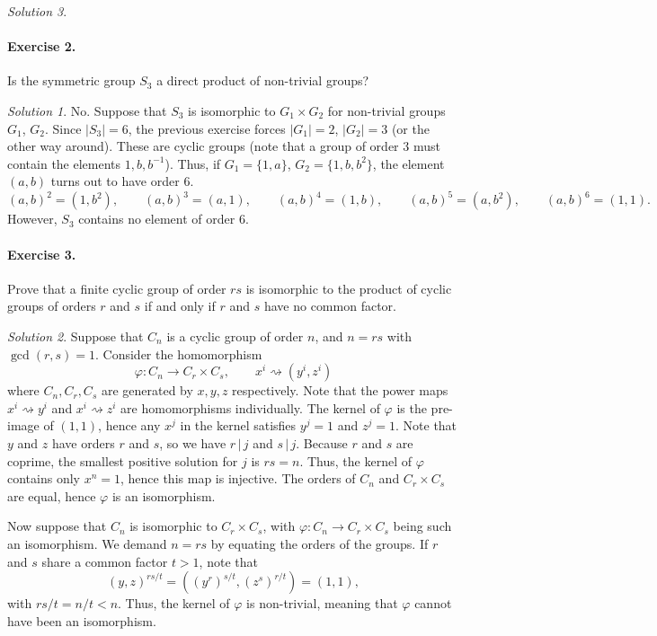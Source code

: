 \documentclass[11pt]{report}
\theoremstyle{remark}
\newtheorem*{solution}{Solution}
\begin{document}
\begin{solution}
    \paragraph{Exercise 2.} Is the symmetric group $S_3$ a direct product of
    non-trivial groups?
    \begin{solution}
        No. Suppose that $S_3$ is isomorphic to $G_1\times G_2$ for non-trivial
        groups $G_1$, $G_2$. Since $|S_3| = 6$, the previous exercise forces $|G_1|
        = 2$, $|G_2| = 3$ (or the other way around). These are cyclic groups (note
        that a group of order $3$ must contain the elements $1, b, b^{-1}$).
        Thus, if $G_1 = \{1, a\}$, $G_2 = \{1, b, b^2\}$, the element $(a, b)$ turns
        out to have order $6$. \[
            (a, b)^2 = (1, b^2), \qquad (a, b)^3 = (a, 1), \qquad (a, b)^4 = (1, b),
            \qquad (a, b)^5 = (a, b^2), \qquad (a, b)^6 = (1, 1).
        \] However, $S_3$ contains no element of order $6$.
    \end{solution}
    
    \paragraph{Exercise 3.} Prove that a finite cyclic group of order $rs$ is
    isomorphic to the product of cyclic groups of orders $r$ and $s$ if and only if
    $r$ and $s$ have no common factor.
    \begin{solution}
        Suppose that $C_n$ is a cyclic group of order $n$, and $n = rs$ with
        $\gcd(r, s) = 1$. Consider the homomorphism \[
            \varphi\colon C_n \to C_r\times C_s, \qquad x^i\rightsquigarrow (y^i,
            z^i)
        \] where $C_n, C_r, C_s$ are generated by $x, y, z$ respectively. Note that
        the power maps $x^i \rightsquigarrow y^i$ and $x^i \rightsquigarrow z^i$ are
        homomorphisms individually. The kernel of $\varphi$ is the pre-image of $(1,
        1)$, hence any $x^j$ in the kernel satisfies $y^j = 1$ and $z^j = 1$. Note
        that $y$ and $z$ have orders $r$ and $s$, so we have $r \,|\, j$ and $s\,|\,
        j$. Because $r$ and $s$ are coprime, the smallest positive solution for $j$
        is $rs = n$. Thus, the kernel of $\varphi$ contains only $x^n = 1$, hence
        this map is injective. The orders of $C_n$ and $C_r\times C_s$ are equal,
        hence $\varphi$ is an isomorphism.

        Now suppose that $C_n$ is isomorphic to $C_r\times C_s$, with $\varphi\colon
        C_n \to C_r\times C_s$ being such an isomorphism. We demand $n = rs$ by
        equating the orders of the groups. If $r$ and $s$ share a common factor $t >
        1$, note that \[
            (y, z)^{rs / t} = ((y^{r})^{s / t}, (z^{s})^{r / t}) = (1, 1),
        \] with $rs / t = n / t < n$. Thus, the kernel of $\varphi$ is non-trivial,
        meaning that $\varphi$ cannot have been an isomorphism.
    \end{solution}
    

\end{solution}
\end{document}
